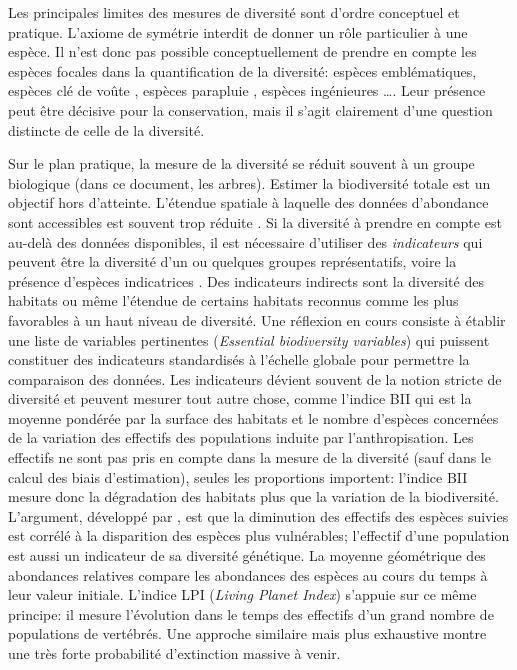 \documentclass[
  11pt,
  french,
  a4paper,
  extrafontsizes,onecolumn,openright
  ]{memoir}
\begin{document}
Les principales limites des mesures de diversité sont d'ordre conceptuel et pratique.
L'axiome de symétrie interdit de donner un rôle particulier à une espèce.
Il n'est donc pas possible conceptuellement de prendre en compte les espèces focales \autocite{Zacharias2001} dans la quantification de la diversité: espèces emblématiques, espèces clé de voûte \autocite{Paine1969}, espèces parapluie \autocite{Roberge2004}, espèces ingénieures \autocite{Jones1994}\ldots.
Leur présence peut être décisive pour la conservation, mais il s'agit clairement d'une question distincte de celle de la diversité.

Sur le plan pratique, la mesure de la diversité se réduit souvent à un groupe biologique (dans ce document, les arbres).
Estimer la biodiversité totale est un objectif hors d'atteinte.
L'étendue spatiale à laquelle des données d'abondance sont accessibles est souvent trop réduite \autocite{Chiarucci2011}.
Si la diversité à prendre en compte est au-delà des données disponibles, il est nécessaire d'utiliser des \emph{indicateurs} \autocite{Balmford2003} qui peuvent être la diversité d'un ou quelques groupes représentatifs, voire la présence d'espèces indicatrices \autocite{Clements1916}.
Des indicateurs indirects sont la diversité des habitats ou même l'étendue de certains habitats reconnus comme les plus favorables à un haut niveau de diversité.
Une réflexion en cours \autocite{Pereira2013} consiste à établir une liste de variables pertinentes (\emph{Essential biodiversity variables}) qui puissent constituer des indicateurs standardisés à l'échelle globale pour permettre la comparaison des données.
Les indicateurs dévient souvent de la notion stricte de diversité et peuvent mesurer tout autre chose, comme l'indice BII \autocite[\emph{Biodiversity Intactness Index},][]{Scholes2005} qui est la moyenne pondérée par la surface des habitats et le nombre d'espèces concernées de la variation des effectifs des populations induite par l'anthropisation.
Les effectifs ne sont pas pris en compte dans la mesure de la diversité (sauf dans le calcul des biais d'estimation), seules les proportions importent: l'indice BII mesure donc la dégradation des habitats plus que la variation de la biodiversité.
L'argument, développé par \textcite{Balmford2003}, est que la diminution des effectifs des espèces suivies est corrélé à la disparition des espèces plus vulnérables; l'effectif d'une population est aussi un indicateur de sa diversité génétique.
La moyenne géométrique des abondances relatives \autocite{Buckland2011} compare les abondances des espèces au cours du temps à leur valeur initiale.
L'indice LPI (\emph{Living Planet Index}) \autocite{Loh2005} s'appuie sur ce même principe: il mesure l'évolution dans le temps des effectifs d'un grand nombre de populations de vertébrés.
Une approche similaire mais plus exhaustive \autocite{Ceballos2017} montre une très forte probabilité d'extinction massive à venir.
\end{document}
